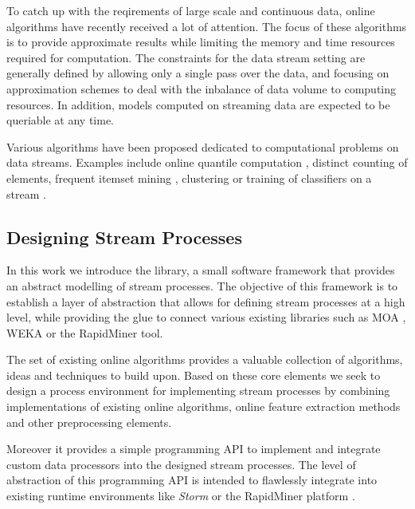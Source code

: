 To catch up with the reqirements of large scale and continuous data,
online algorithms have recently received a lot of attention. The focus
of these algorithms is to provide approximate results while limiting
the memory and time resources required for computation. The
constraints for the data stream setting are generally defined by
allowing only a single pass over the data, and focusing on
approximation schemes to deal with the inbalance of data volume to
computing resources. In addition, models computed on streaming data
are expected to be queriable at any time.

Various algorithms have been proposed dedicated to computational
problems on data streams. Examples include online quantile computation
\cite{Greenwald/Khanna/2001a,Arasu/Manku/2004a}, distinct counting of
elements, frequent itemset mining
\cite{Charikar02findingfrequent,goethals2007,Cheng06maintainingfrequent},
clustering \cite{sohler2010,Aggarwal:2003} or training of classifiers
on a stream \cite{Domingos/Hulten/2000a}.


\subsection{Designing Stream Processes}
In this work we introduce the \streams library, a small software
framework that provides an abstract modelling of stream processes. The
objective of this framework is to establish a layer of abstraction
that allows for defining stream processes at a high level, while
providing the glue to connect various existing libraries such as MOA
\cite{moa}, WEKA \cite{weka} or the RapidMiner tool.

The set of existing online algorithms provides a valuable collection
of algorithms, ideas and techniques to build upon. Based on these core
elements we seek to design a process environment for implementing
stream processes by combining implementations of existing online
algorithms, online feature extraction methods and other preprocessing
elements.

Moreover it provides a simple programming API to implement and
integrate custom data processors into the designed stream processes.
The level of abstraction of this programming API is intended to
flawlessly integrate into existing runtime environments like {\em
  Storm} or the RapidMiner platform \cite{rapidminer}.

